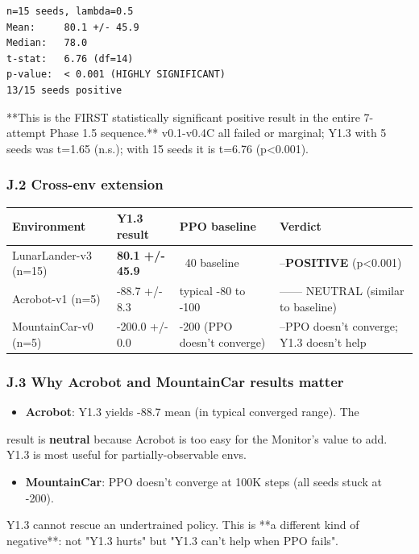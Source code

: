 \documentclass[11pt]{article}
\begin{document}
\begin{verbatim}
n=15 seeds, lambda=0.5
Mean:     80.1 +/- 45.9
Median:   78.0
t-stat:   6.76 (df=14)
p-value:  < 0.001 (HIGHLY SIGNIFICANT)
13/15 seeds positive
\end{verbatim}

**This is the FIRST statistically significant positive result in the entire
7-attempt Phase 1.5 sequence.** v0.1-v0.4C all failed or marginal; Y1.3 with 5 seeds
was t=1.65 (n.s.); with 15 seeds it is t=6.76 (p<0.001).

\subsubsection{J.2 Cross-env extension}

\begin{tabular}{llll}
Environment & Y1.3 result & PPO baseline & Verdict \\
\hline
LunarLander-v3 (n=15) & \textbf{80.1 +/- 45.9} & ~40 baseline & --\textbf{POSITIVE} (p<0.001) \\
Acrobot-v1 (n=5) & -88.7 +/- 8.3 & typical -80 to -100 & ------ NEUTRAL (similar to baseline) \\
MountainCar-v0 (n=5) & -200.0 +/- 0.0 & -200 (PPO doesn't converge) & --PPO doesn't converge; Y1.3 doesn't help \\
\end{tabular}


\subsubsection{J.3 Why Acrobot and MountainCar results matter}

\begin{itemize}
  \item \textbf{Acrobot}: Y1.3 yields -88.7 mean (in typical converged range). The
\end{itemize}

  result is \textbf{neutral} because Acrobot is too easy for the Monitor's
  value to add. Y1.3 is most useful for partially-observable envs.

\begin{itemize}
  \item \textbf{MountainCar}: PPO doesn't converge at 100K steps (all seeds stuck at -200).
\end{itemize}

  Y1.3 cannot rescue an undertrained policy. This is **a different kind of
  negative**: not "Y1.3 hurts" but "Y1.3 can't help when PPO fails".
\end{document}
